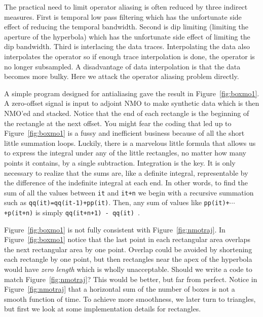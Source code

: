 \par
The practical need to limit operator aliasing
is often reduced by three indirect measures.
First is temporal low pass filtering
which has the unfortunate side effect
of reducing the temporal bandwidth.
Second is dip limiting (limiting the aperture of the hyperbola)
which has the unfortunate side effect of limiting the dip bandwidth.
Third is interlacing the data traces.
Interpolating the data also interpolates the operator
so if enough trace interpolation is done, the operator is no longer subsampled.
A disadvantage of data interpolation is that the data becomes more bulky.
Here we attack the operator aliasing problem directly.


\par
A simple program designed for antialiasing
gave the result in Figure~\ref{fig:boxmo1}.
A zero-offset signal is input to adjoint NMO to make
synthetic data which is then NMO'ed and stacked.
Notice that the end of each rectangle
is the beginning of the rectangle at the next offset. %
You might fear the coding that led up to Figure~\ref{fig:boxmo1}
is a fussy and inefficient business
because of all the short little summation loops.
Luckily, there is a marvelous little formula that allows
us to express the integral under any of the little rectangles,
no matter how many points it contains,
by a single subtraction.
Integration is the key.
It is only necessary to realize that the sums are,
like a definite integral,
representable by the difference of the indefinite integral at each end.
In other words, to find the sum of all the values between
{\tt it} and {\tt it+n} we begin with
a recursive summation such as {\tt qq(it)=qq(it-1)+pp(it)}.
Then, any sum of values like {\tt pp(it)+$\cdots $+p(it+n)} is simply
{\tt qq(it+n+1) - qq(it) }.

\par
Figure~\ref{fig:boxmo1} is not fully consistent with Figure~\ref{fig:nmotraj}.
In Figure~\ref{fig:boxmo1} notice that the last point in each rectangular area
overlaps the next rectangular area by one point.
Overlap could be avoided by shortening each rectangle by one point,
but then rectangles near the apex of the hyperbola
would have {\em  zero length} which is wholly unacceptable.
Should we write a code to match Figure~\ref{fig:nmotraj}?
This would be better, but far from perfect.
Notice in Figure~\ref{fig:nmotraj} that a horizontal sum of the number of boxes
is not a smooth function of time.
To achieve more smoothness, we later turn to triangles,
but first we look at some implementation details for rectangles.

